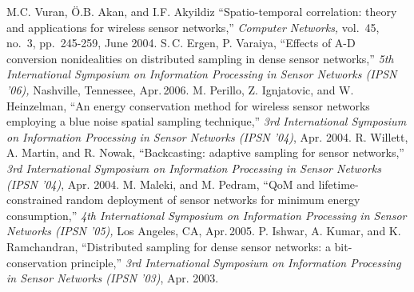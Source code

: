 \documentclass[final, a4paper]{IEEEtran}
\begin{document}
\begin{thebibliography}{99}
M.C. Vuran, \"O.B. Akan, and I.F. Akyildiz
``Spatio-temporal correlation: theory and applications for wireless sensor networks,''
{\em Computer Networks,} vol.\ 45, no.\ 3, pp.\ 245-259, June 2004.
 S.\,C. Ergen, P. Varaiya, ``Effects of A-D conversion nonidealities on
distributed sampling in dense sensor networks,''
{\em 5th International Symposium on Information Processing in Sensor Networks (IPSN '06),}
Nashville, Tennessee, Apr.\,2006.
 M. Perillo, Z. Ignjatovic, and W. Heinzelman, ``An
energy conservation method for wireless sensor networks employing a blue
noise spatial sampling technique,'' {\em 3rd International Symposium on
Information Processing in Sensor Networks (IPSN '04)}, Apr. 2004.
 R. Willett, A. Martin, and R. Nowak, ``Backcasting:
adaptive sampling for sensor networks,'' {\em 3rd International
Symposium on Information Processing in Sensor Networks (IPSN '04)},
Apr. 2004.
 M. Maleki, and M. Pedram,
``QoM and lifetime-constrained random deployment of sensor networks
for minimum energy consumption,''
{\em 4th International Symposium on Information Processing in Sensor Networks (IPSN '05),}
Los Angeles, CA, Apr.\,2005.
 P. Ishwar, A. Kumar, and K. Ramchandran, ``Distributed
sampling for dense sensor networks: a bit-conservation principle,''
{\em 3rd International Symposium on Information Processing in Sensor
Networks (IPSN '03)}, Apr. 2003.


\end{thebibliography}
\end{document}

